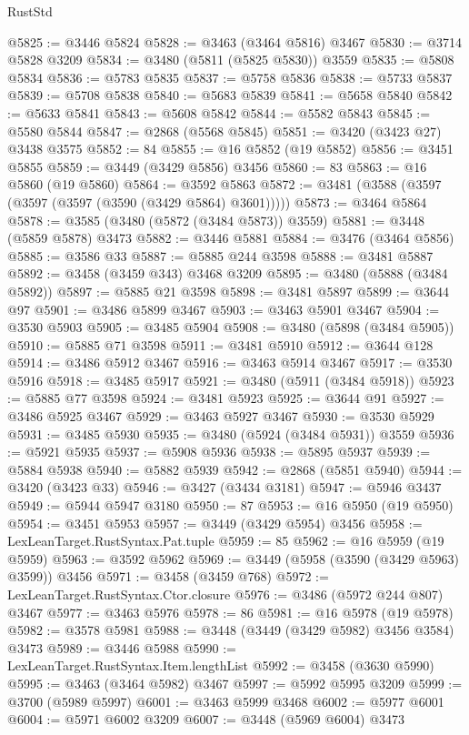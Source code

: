 \begin{lexlean}{RustStd}
\begin{coremodule}
{\begin{coremodule}
{{{{{{{{{{{{{{{{{{{{{{{{{{{{{{{{{{{{{{{{{{{{{{{{{{{{{{{{{{{{{{{{{{{{{{{{{{{{{{{{{{{{{@5825 := @3446 @5824
@5828 := @3463 (@3464 @5816) @3467
@5830 := @3714 @5828 @3209
@5834 := @3480 (@5811 (@5825 @5830)) @3559
@5835 := @5808 @5834
@5836 := @5783 @5835
@5837 := @5758 @5836
@5838 := @5733 @5837
@5839 := @5708 @5838
@5840 := @5683 @5839
@5841 := @5658 @5840
@5842 := @5633 @5841
@5843 := @5608 @5842
@5844 := @5582 @5843
@5845 := @5580 @5844
@5847 := @2868 (@5568 @5845)
@5851 := @3420 (@3423 @27) @3438 @3575
@5852 := 84
@5855 := @16 @5852 (@19 @5852)
@5856 := @3451 @5855
@5859 := @3449 (@3429 @5856) @3456
@5860 := 83
@5863 := @16 @5860 (@19 @5860)
@5864 := @3592 @5863
@5872 := @3481 (@3588 (@3597 (@3597 (@3597 (@3590 (@3429 @5864) @3601)))))
@5873 := @3464 @5864
@5878 := @3585 (@3480 (@5872 (@3484 @5873)) @3559)
@5881 := @3448 (@5859 @5878) @3473
@5882 := @3446 @5881
@5884 := @3476 (@3464 @5856)
@5885 := @3586 @33
@5887 := @5885 @244 @3598
@5888 := @3481 @5887
@5892 := @3458 (@3459 @343) @3468 @3209
@5895 := @3480 (@5888 (@3484 @5892))
@5897 := @5885 @21 @3598
@5898 := @3481 @5897
@5899 := @3644 @97
@5901 := @3486 @5899 @3467
@5903 := @3463 @5901 @3467
@5904 := @3530 @5903
@5905 := @3485 @5904
@5908 := @3480 (@5898 (@3484 @5905))
@5910 := @5885 @71 @3598
@5911 := @3481 @5910
@5912 := @3644 @128
@5914 := @3486 @5912 @3467
@5916 := @3463 @5914 @3467
@5917 := @3530 @5916
@5918 := @3485 @5917
@5921 := @3480 (@5911 (@3484 @5918))
@5923 := @5885 @77 @3598
@5924 := @3481 @5923
@5925 := @3644 @91
@5927 := @3486 @5925 @3467
@5929 := @3463 @5927 @3467
@5930 := @3530 @5929
@5931 := @3485 @5930
@5935 := @3480 (@5924 (@3484 @5931)) @3559
@5936 := @5921 @5935
@5937 := @5908 @5936
@5938 := @5895 @5937
@5939 := @5884 @5938
@5940 := @5882 @5939
@5942 := @2868 (@5851 @5940)
@5944 := @3420 (@3423 @33)
@5946 := @3427 (@3434 @3181)
@5947 := @5946 @3437
@5949 := @5944 @5947 @3180
@5950 := 87
@5953 := @16 @5950 (@19 @5950)
@5954 := @3451 @5953
@5957 := @3449 (@3429 @5954) @3456
@5958 := LexLeanTarget.RustSyntax.Pat.tuple
@5959 := 85
@5962 := @16 @5959 (@19 @5959)
@5963 := @3592 @5962
@5969 := @3449 (@5958 (@3590 (@3429 @5963) @3599)) @3456
@5971 := @3458 (@3459 @768)
@5972 := LexLeanTarget.RustSyntax.Ctor.closure
@5976 := @3486 (@5972 @244 @807) @3467
@5977 := @3463 @5976
@5978 := 86
@5981 := @16 @5978 (@19 @5978)
@5982 := @3578 @5981
@5988 := @3448 (@3449 (@3429 @5982) @3456 @3584) @3473
@5989 := @3446 @5988
@5990 := LexLeanTarget.RustSyntax.Item.lengthList
@5992 := @3458 (@3630 @5990)
@5995 := @3463 (@3464 @5982) @3467
@5997 := @5992 @5995 @3209
@5999 := @3700 (@5989 @5997)
@6001 := @3463 @5999 @3468
@6002 := @5977 @6001
@6004 := @5971 @6002 @3209
@6007 := @3448 (@5969 @6004) @3473
}}}}}}}}}}}}}}}}}}}}}}}}}}}}}}}}}}}}}}}}}}}}}}}}}}}}}}}}}}}}}}}}}}}}}}}}}}}}}}}}}}}}}
\end{coremodule}}
\end{coremodule}
\end{lexlean}
